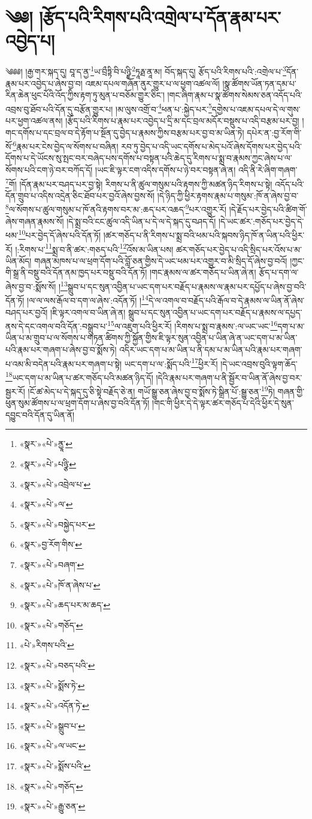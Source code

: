\chapter{༄༅། །རྩོད་པའི་རིགས་པའི་འགྲེལ་པ་དོན་རྣམ་པར་འབྱེད་པ།}༄༅༅། །རྒྱ་གར་སྐད་དུ། བཱ་ད་ནྱ་\footnote{«སྣར་»«པེ་»ནྱཱ་}ཡ་བྲྀཏྟི་བི་པཉྫི་\footnote{«སྣར་»«པེ་»པཉྩི་}ཏཱརྠ་ནཱ་མ། བོད་སྐད་དུ། རྩོད་པའི་རིགས་པའི་:འགྲེལ་པ་\footnote{«སྣར་»«པེ་»འབྲེལ་པ་}དོན་རྣམ་པར་འབྱེད་པ་ཞེས་བྱ་བ། འཇམ་དཔལ་གཞོན་ནུར་གྱུར་པ་ལ་ཕྱག་འཚལ་ལོ། །སྣ་ཚོགས་ཡོན་ཏན་དམ་པ་རིན་ཆེན་ཕུང་པོའི་འོད་ཀྱིས་རྟག་ཏུ་མུན་པ་བཅོམ་གྱུར་ཅིང་། །གང་ཞིག་རྣམ་པ་སྣ་ཚོགས་སེམས་ཅན་འདོད་པའི་འབྲས་བུ་ཐོབ་པའི་དོན་དུ་བརྩོན་གྱུར་པ། །མ་ལུས་འགྲོ་བ་\footnote{«སྣར་»«པེ་»ལ་}ཕན་པ་:སྐྱེད་པར་\footnote{«སྣར་»«པེ་»བསྐྱེད་པར་}དགྱེས་པ་འཇམ་དཔལ་དེ་ལ་གུས་པར་ཕྱག་འཚལ་ནས། །རྩོད་པའི་རིགས་པ་རྣམ་པར་འབྱེད་པ་དྲི་མ་དང་བྲལ་མདོར་བསྡུས་པ་འདི་བརྩམ་པར་བྱ། །གང་དགོས་པ་དང་བྲལ་བ་དེ་རྟོག་པ་སྔོན་དུ་བྱེད་པ་རྣམས་ཀྱིས་བརྩམ་པར་བྱ་བ་མ་ཡིན་ཏེ། དཔེར་ན་:བྱ་རོག་གི་སོ་\footnote{«སྣར་»བྱ་རོག་གིས་}རྣམ་པར་ངེས་བྱེད་ལ་སོགས་པ་བཞིན། རབ་ཏུ་བྱེད་པ་འདི་ཡང་དགོས་པ་མེད་པའོ་ཞེས་དོགས་པར་བྱེད་པའི་དོགས་པ་དེ་ཡོངས་སུ་སྤང་བར་བཞེད་པས་དགོས་པ་བསྟན་པའི་ཆེད་དུ་རིགས་པ་སྨྲ་བ་རྣམས་ཀྱང་ཞེས་པ་ལ་སོགས་པའི་ངག་ཉེ་བར་བཀོད་དོ། །ཡང་ཇི་ལྟར་ངག་འདིས་དགོས་པ་ཉེ་བར་བསྟན་ཞེ་ན། འདི་ནི་རེ་ཞིག་གཞག་\footnote{«སྣར་»«པེ་»བཞག་}གོ། །དོན་རྣམ་པར་བཤད་པར་བྱ་སྟེ། རིགས་པ་ནི་ཚུལ་གསུམ་པའི་རྟགས་ཀྱི་མཚན་ཉིད་རིགས་པ་སྟེ། འདོད་པའི་དོན་གྲུབ་པ་འདིས་འདྲེན་ཅིང་ཐོབ་པར་བྱའོ་ཞེས་བྱས་སོ། །དེ་ཉིད་ཀྱི་ཕྱིར་རྟགས་རྣམ་པ་གསུམ་:ཁོ་ན་ཞེས་བྱ་བ་\footnote{«སྣར་»«པེ་»ཁོ་ན་ཞེས་པ་}ལ་སོགས་པ་ཚུལ་གསུམ་པ་ཁོ་ནའི་རྟགས་བར་མ་:ཆད་པར་འཆད་\footnote{«སྣར་»«པེ་»ཆད་པར་མ་ཆད་}པར་འགྱུར་རོ། །དེ་རྗོད་པར་བྱེད་པའི་ཚིག་གོ་ཞེས་གཞན་རྣམས་སོ། །དེ་སྨྲ་བའི་ངང་ཚུལ་འདི་ཡིན་པ་དེ་ལ་དེ་སྐད་དུ་བཤད་དོ། །དེ་ཡང་ཚར་:གཅོད་པར་བྱེད་དེ་ཕམ་\footnote{«སྣར་»«པེ་»གཅོད་}པར་བྱེད་དོ་ཞེས་པའི་དོན་ཏོ། །ཚར་གཅོད་པ་ནི་རིགས་པ་སྨྲ་བའི་ཕམ་པའི་སྐབས་ཉིད་ཁོ་ན་ཡིན་པའི་ཕྱིར་རོ། །:རིགས་པ་\footnote{«པེ་»རིགས་པའི་}སྨྲ་བ་ནི་ཚར་:གཅད་པའི་\footnote{«སྣར་»«པེ་»བཅད་པའི་}འོས་མ་ཡིན་པས། ཚར་གཅོད་པར་བྱེད་པ་འདི་སྲིད་པར་འོས་པ་མ་ཡིན་མོད། གཞན་མཁས་པ་ལ་ཕྲག་དོག་པའི་བློ་ཅན་གྱིས་དེ་ཡང་ཕམ་པར་འགྱུར་བ་མི་སྲིད་དོ་ཞེས་བྱ་བའོ། །ཀྱང་གི་སྒྲ་ནི་བསྡུ་བའི་དོན་ནམ་ཁྱད་པར་བསྡུ་བའི་དོན་ཏོ། །གང་རྣམས་ལ་ཚར་གཅོད་པ་ཡིན་ཞེ་ན། རྩོད་པ་དག་ལ་ཞེས་བྱ་བ་:སྨོས་སོ། །\footnote{«སྣར་»«པེ་»སྨོས་ཏེ་}སྒྲུབ་པ་དང་སུན་འབྱིན་པ་ཡང་དག་པར་བརྗོད་པ་རྣམས་ལ་རྣམ་པར་དཔྱོད་པ་ཞེས་བྱ་བའི་དོན་ཏོ། །ལ་ལ་ལས་རྒོལ་བ་དག་ལ་ཞེས་:འདོན་ཏོ། །\footnote{«སྣར་»«པེ་»འདོན་ཏེ་}དེ་ལ་འགལ་བ་བརྗོད་པའི་རྒོལ་བ་དེ་རྣམས་ལ་ཡིན་ནོ་ཞེས་བཤད་པར་བྱའོ། །ཇི་ལྟར་འགལ་བ་ཡིན་ཞེ་ན། སྒྲུབ་པ་དང་སུན་འབྱིན་པ་ཡང་དག་པར་བརྗོད་པ་རྣམས་ལ་དཔྱད་ནས་དེ་དང་འགལ་བའི་དོན་:བསྒྲུབ་པ་\footnote{«སྣར་»«པེ་»སྒྲུབ་པ་}ལ་འཇུག་པའི་ཕྱིར་རོ། །རིགས་པ་སྨྲ་བ་རྣམས་:ལ་ཡང་ཡང་\footnote{«སྣར་»«པེ་»ལ་ཡང་}དག་པ་མ་ཡིན་པ་མ་གྲུབ་པ་ལ་སོགས་པ་གཏན་ཚིགས་ཀྱི་སྐྱོན་གྱིས་ཇི་ལྟར་སུན་འབྱིན་པ་ཡིན་ཞེ་ན་ཡང་དག་པ་མ་ཡིན་པའི་རྣམ་པར་གཞག་པ་ཞེས་བྱ་བ་སྨོས་ཏེ། འདིར་ཡང་དག་པ་མ་ཡིན་པ་ནི་དམ་པ་མ་ཡིན་པའི་རྣམ་པར་གཞག་པ་འམ་མི་བདེན་པའི་རྣམ་པར་གཞག་པ་སྟེ། ཡང་དག་པ་ལ་:སྨོད་པའི་\footnote{«སྣར་»«པེ་»སྨོས་པའི་}ཕྱིར་རོ། །དེ་ཡང་འབྲས་བུའི་ལྟག་ཆོད་\footnote{«སྣར་»«པེ་»གཅོད་}ཡང་དག་པ་མ་ཡིན་པ་ཚར་གཅོད་པའི་མཚན་ཉིད་དོ། །དེའི་རྣམ་པར་གཞག་པ་ནི་སྦྱོར་བ་ཡིན་ནོ་ཞེས་བྱ་བར་སྦྱར་རོ། །ངོ་ཚ་མེད་པ་དེ་སྐད་དུ་ཅི་སྟེ་བརྗོད་ཅེ་ན། གཡོ་སྒྱུ་ཅན་ཞེས་བྱ་བ་སྨོས་ཏེ་སྒྲིན་པོ་:སྒྱུ་ཅན་\footnote{«སྣར་»«པེ་»རྒྱུ་ཅན་}ཏེ། གཞན་གྱི་ཕུན་སུམ་ཚོགས་པ་ལ་ཕྲག་དོག་པ་ཞེས་བྱ་བའི་དོན་ཏོ། །གང་གི་ཕྱིར་དེ་དེ་ལྟར་ཚར་གཅོད་པ་དེའི་ཕྱིར་དེ་སུན་དབྱུང་བའི་དོན་དུ་ཡིན་ནོ། 